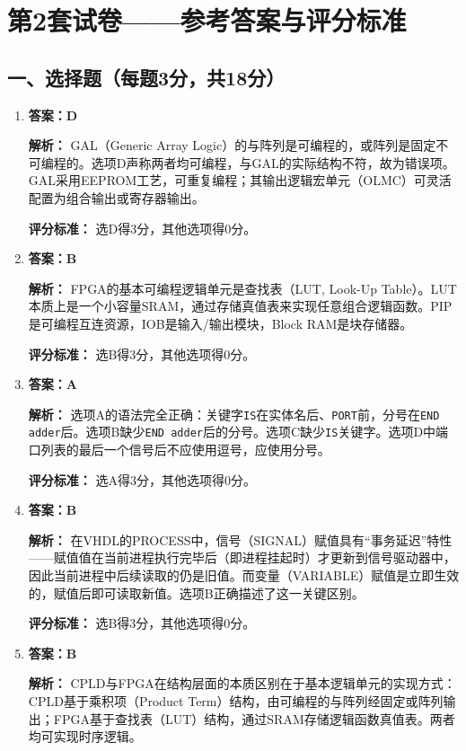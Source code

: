 \chapter{第2套试卷——参考答案与评分标准}

\section{一、选择题（每题3分，共18分）}

\begin{enumerate}[label=\arabic*.]

\item \textbf{答案：D}

\textbf{解析：} GAL（Generic Array Logic）的与阵列是可编程的，或阵列是固定不可编程的。选项D声称两者均可编程，与GAL的实际结构不符，故为错误项。GAL采用EEPROM工艺，可重复编程；其输出逻辑宏单元（OLMC）可灵活配置为组合输出或寄存器输出。

\textbf{评分标准：} 选D得3分，其他选项得0分。

\item \textbf{答案：B}

\textbf{解析：} FPGA的基本可编程逻辑单元是查找表（LUT, Look-Up Table）。LUT本质上是一个小容量SRAM，通过存储真值表来实现任意组合逻辑函数。PIP是可编程互连资源，IOB是输入/输出模块，Block RAM是块存储器。

\textbf{评分标准：} 选B得3分，其他选项得0分。

\item \textbf{答案：A}

\textbf{解析：} 选项A的语法完全正确：关键字\texttt{IS}在实体名后、\texttt{PORT}前，分号在\texttt{END adder}后。选项B缺少\texttt{END adder}后的分号。选项C缺少\texttt{IS}关键字。选项D中端口列表的最后一个信号后不应使用逗号，应使用分号。

\textbf{评分标准：} 选A得3分，其他选项得0分。

\item \textbf{答案：B}

\textbf{解析：} 在VHDL的PROCESS中，信号（SIGNAL）赋值具有“事务延迟”特性——赋值值在当前进程执行完毕后（即进程挂起时）才更新到信号驱动器中，因此当前进程中后续读取的仍是旧值。而变量（VARIABLE）赋值是立即生效的，赋值后即可读取新值。选项B正确描述了这一关键区别。

\textbf{评分标准：} 选B得3分，其他选项得0分。

\item \textbf{答案：B}

\textbf{解析：} CPLD与FPGA在结构层面的本质区别在于基本逻辑单元的实现方式：CPLD基于乘积项（Product Term）结构，由可编程的与阵列经固定或阵列输出；FPGA基于查找表（LUT）结构，通过SRAM存储逻辑函数真值表。两者均可实现时序逻辑。


\end{enumerate}
